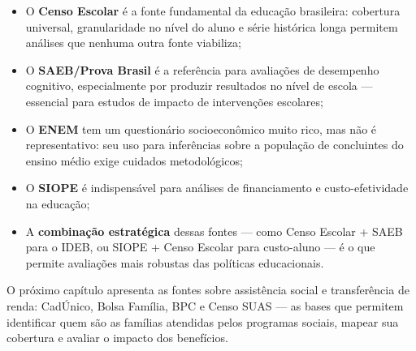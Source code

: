 \begin{itemize}
  \item O \textbf{Censo Escolar} é a fonte fundamental da educação brasileira: cobertura universal, granularidade no nível do aluno e série histórica longa permitem análises que nenhuma outra fonte viabiliza;
  \item O \textbf{SAEB/Prova Brasil} é a referência para avaliações de desempenho cognitivo, especialmente por produzir resultados no nível de escola — essencial para estudos de impacto de intervenções escolares;
  \item O \textbf{ENEM} tem um questionário socioeconômico muito rico, mas não é representativo: seu uso para inferências sobre a população de concluintes do ensino médio exige cuidados metodológicos;
  \item O \textbf{SIOPE} é indispensável para análises de financiamento e custo-efetividade na educação;
  \item A \textbf{combinação estratégica} dessas fontes — como Censo Escolar + SAEB para o IDEB, ou SIOPE + Censo Escolar para custo-aluno — é o que permite avaliações mais robustas das políticas educacionais.
\end{itemize}

O próximo capítulo apresenta as fontes sobre assistência social e transferência de renda: CadÚnico, Bolsa Família, BPC e Censo SUAS --- as bases que permitem identificar quem são as famílias atendidas pelos programas sociais, mapear sua cobertura e avaliar o impacto dos benefícios.
